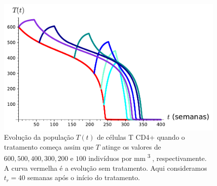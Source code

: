 \begin{figure}[ht!]
    \begin{center}
        \includegraphics[width=.85\textwidth]{./figuras/different_start_tr280.pdf}
    \end{center}
    \caption{Evolução da população \( T ( t ) \) de células T CD4+ quando o tratamento começa assim que \( T \) atinge os valores de \( 600, 500, 400, 300, 200 \) e \( 100 \) indivíduos por \unit{mm^{ 3 }}, respectivamente.
    A curva vermelha é a evolução sem tratamento.
    Aqui consideramos \( t_{ r } = 40 \) semanas após o início do tratamento.}
    \label{fig: multiple_starts_tr40}
\end{figure}





